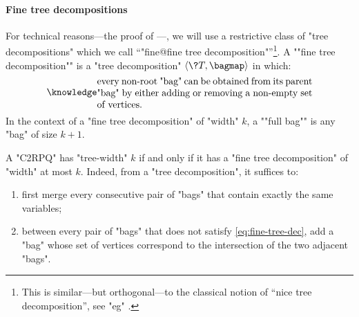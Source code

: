 \paragraph*{Fine tree decompositions}
\AP For technical reasons---the proof of ---, we will use a restrictive class of "tree decompositions" which we call ``"fine@fine tree decomposition"''\footnote{This is similar---but orthogonal---to the classical notion of
``nice tree decomposition'', see "eg" \cite[Definition 13.1.4, page 149]{Kloks1994Treewidth}.}. A \AP""fine tree decomposition"" is a "tree decomposition" $\tup{\?T, \bagmap}$ in which:
\begin{equation}
	\AP\label{eq:fine-tree-dec}
	\parbox{.65\linewidth}{every non-root "bag" can be obtained from its parent "bag" by
	either adding or removing a non-empty set of vertices.}%
\end{equation}
In the context of a "fine tree decomposition" of "width" $k$, a \AP""full bag"" is any "bag" of size $k+1$.

A "C2RPQ" has "tree-width" $k$ if and only if it has a "fine tree decomposition" of "width" at most $k$. Indeed, from a "tree decomposition", it suffices to:
\begin{enumerate}
	\item first merge every consecutive pair of "bags" that contain exactly the same variables;
	\item between every pair of "bags"
	that does not satisfy \eqref{eq:fine-tree-dec}, add a "bag" whose set of vertices
	correspond to the intersection of the two adjacent "bags".
\end{enumerate}